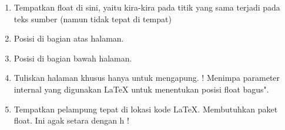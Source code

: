 \vspace{14pt}
\vspace{18pt}
\noindent 
\begin{enumerate}


 
\item Tempatkan float di sini, yaitu kira-kira pada titik yang sama terjadi pada teks sumber (namun tidak tepat di tempat) 

\item Posisi di bagian atas halaman. 


\item Posisi di bagian bawah halaman. 
 


\item Tuliskan halaman khusus hanya untuk mengapung. ! Menimpa parameter internal yang digunakan LaTeX untuk menentukan posisi float bagus".


\item Tempatkan pelampung tepat di lokasi kode LaTeX. Membutuhkan paket float. Ini agak setara dengan h !
	 
\end{enumerate}

